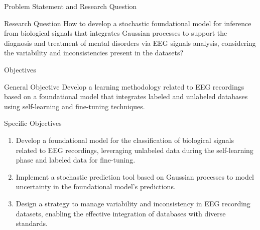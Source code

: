 \documentclass[spanish, aspectratio=169]{beamer}
\begin{document}
\begin{frame}{Problem Statement and Research Question}
	
	
	
	
	\begin{block}{Research Question}
		\footnotesize
		How to develop a stochastic foundational model for inference from biological signals that integrates Gaussian processes to support the diagnosis and treatment of mental disorders via EEG signals analysis, considering the variability and inconsistencies present in the datasets?
	\end{block}	
\end{frame}

\begin{frame}{Objectives}
	\vspace{-0.3cm}
	\begin{block}{General Objective}
		\footnotesize
		Develop a learning methodology related to EEG recordings based on a foundational model that integrates labeled and unlabeled databases using self-learning and fine-tuning techniques.
	\end{block}
	
	\vspace{0.4cm}
	\begin{block}{Specific Objectives}
		\footnotesize
		\begin{enumerate}
			\item Develop a foundational model for the classification of biological signals related to EEG recordings, leveraging unlabeled data during the self-learning phase and labeled data for fine-tuning.
			\item Implement a stochastic prediction tool based on Gaussian processes to model uncertainty in the foundational model's predictions.
			\item Design a strategy to manage variability and inconsistency in EEG recording datasets, enabling the effective integration of databases with diverse standards.
		\end{enumerate}
	\end{block}
\end{frame}

	
\end{document}
